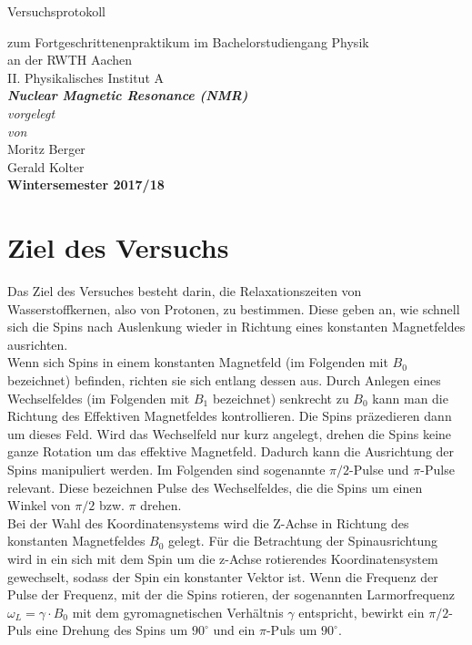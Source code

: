 \documentclass[12pt,a4paper]{article}
\author{Gerald}
\begin{document}
	\setlength{\parindent}{0pt} 
	\begin{center}
		{\LARGE Versuchsprotokoll}\\
		\begin{large}
			zum Fortgeschrittenenpraktikum im Bachelorstudiengang Physik\\[0.4cm]
			an der RWTH Aachen\\
			II. Physikalisches Institut A\\[5.5cm]
			\Large\textbf{\textsl{Nuclear Magnetic Resonance (NMR)}}\\[5.5cm]
			\normalsize\textit{vorgelegt\\von}\\[0.4cm]
			\large{Moritz Berger\\Gerald Kolter}\\[2cm]
			\large \textbf{Wintersemester 2017/18}
		\end{large}
	\end{center}
	\newpage
	
	\tableofcontents
	\newpage

\section{Ziel des Versuchs}
Das Ziel des Versuches besteht darin, die Relaxationszeiten von Wasserstoffkernen, also von Protonen, zu bestimmen. Diese geben an, wie schnell sich die Spins nach Auslenkung wieder in Richtung eines konstanten Magnetfeldes ausrichten.\\
Wenn sich Spins in einem konstanten Magnetfeld (im Folgenden mit $B_0$ bezeichnet) befinden, richten sie sich entlang dessen aus. Durch Anlegen eines Wechselfeldes (im Folgenden mit $B_1$ bezeichnet) senkrecht zu $B_0$ kann man die Richtung des Effektiven Magnetfeldes kontrollieren. Die Spins präzedieren dann um dieses Feld. Wird das Wechselfeld nur kurz angelegt, drehen die Spins keine ganze Rotation um das effektive Magnetfeld. Dadurch kann die Ausrichtung der Spins manipuliert werden. Im Folgenden sind sogenannte $\pi /2$-Pulse und $\pi$-Pulse relevant. Diese bezeichnen Pulse des Wechselfeldes, die die Spins um einen Winkel von $\pi /2$ bzw. $\pi$ drehen.\\
Bei der Wahl des Koordinatensystems wird die Z-Achse in Richtung des konstanten Magnetfeldes $B_0$ gelegt. Für die Betrachtung der Spinausrichtung wird in ein sich mit dem Spin um die z-Achse rotierendes Koordinatensystem gewechselt, sodass der Spin ein konstanter Vektor ist. Wenn die Frequenz der Pulse der Frequenz, mit der die Spins rotieren, der sogenannten Larmorfrequenz $\omega _L = \gamma \cdot B_0$ mit dem gyromagnetischen Verhältnis $\gamma$ entspricht, bewirkt ein $\pi /2$-Puls eine Drehung des Spins um $90^\circ$ und ein $\pi$-Puls um $90^\circ$.
\end{document}
